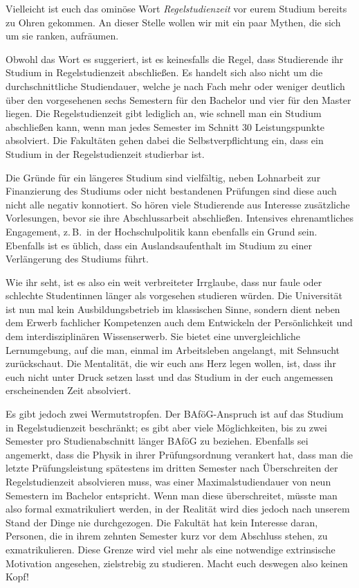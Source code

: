 Vielleicht ist euch das ominöse Wort \emph{Regelstudienzeit} vor eurem Studium bereits zu Ohren gekommen. An dieser Stelle wollen wir mit ein paar Mythen, die sich um sie ranken, aufräumen.

Obwohl das Wort es suggeriert, ist es keinesfalls die Regel, dass Studierende ihr Studium in Regelstudienzeit abschließen. Es handelt sich also nicht um die durchschnittliche Studiendauer, welche je nach Fach mehr oder weniger deutlich über den vorgesehenen sechs Semestern für den Bachelor und vier für den Master liegen. Die Regelstudienzeit gibt lediglich an, wie schnell man ein Studium abschließen kann, wenn man jedes Semester im Schnitt 30 Leistungspunkte absolviert. Die Fakultäten gehen dabei die Selbstverpflichtung ein, dass ein Studium in der Regelstudienzeit studierbar ist.

Die Gründe für ein längeres Studium sind vielfältig, neben Lohnarbeit zur Finanzierung des Studiums oder nicht bestandenen Prüfungen sind diese auch nicht alle negativ konnotiert. So hören viele Studierende aus Interesse zusätzliche Vorlesungen, bevor sie ihre Abschlussarbeit abschließen. Intensives ehrenamtliches Engagement, z.\,B.~in der Hochschulpolitik kann ebenfalls ein Grund sein. Ebenfalls ist es üblich, dass ein Auslandsaufenthalt im Studium zu einer Verlängerung des Studiums führt.

Wie ihr seht, ist es also ein weit verbreiteter Irrglaube, dass nur faule oder schlechte Studentinnen länger als vorgesehen studieren würden. Die Universität ist nun mal kein Ausbildungsbetrieb im klassischen Sinne, sondern dient neben dem Erwerb fachlicher Kompetenzen auch dem Entwickeln der Persönlichkeit und dem interdisziplinären Wissenserwerb. Sie bietet eine unvergleichliche Lernumgebung, auf die man, einmal im Arbeitsleben angelangt, mit Sehnsucht zurückschaut. Die Mentalität, die wir euch ans Herz legen wollen, ist, dass ihr euch nicht unter Druck setzen lasst und das Studium in der euch angemessen erscheinenden Zeit absolviert.

Es gibt jedoch zwei Wermutstropfen. Der BAföG-Anspruch ist auf das Studium in Regelstudienzeit beschränkt; es gibt aber viele Möglichkeiten, bis zu zwei Semester pro Studienabschnitt länger BAföG zu beziehen. Ebenfalls sei angemerkt, dass die Physik in ihrer Prüfungsordnung verankert hat, dass man die letzte Prüfungsleistung spätestens im dritten Semester nach Überschreiten der Regelstudienzeit absolvieren muss, was einer Maximalstudiendauer von neun Semestern im Bachelor entspricht. Wenn man diese überschreitet, müsste man also formal exmatrikuliert werden, in der Realität wird dies jedoch nach unserem Stand der Dinge nie durchgezogen. Die Fakultät hat kein Interesse daran, Personen, die in ihrem zehnten Semester kurz vor dem Abschluss stehen, zu exmatrikulieren. Diese Grenze wird viel mehr als eine notwendige extrinsische Motivation angesehen, zielstrebig zu studieren. Macht euch deswegen also keinen Kopf!


